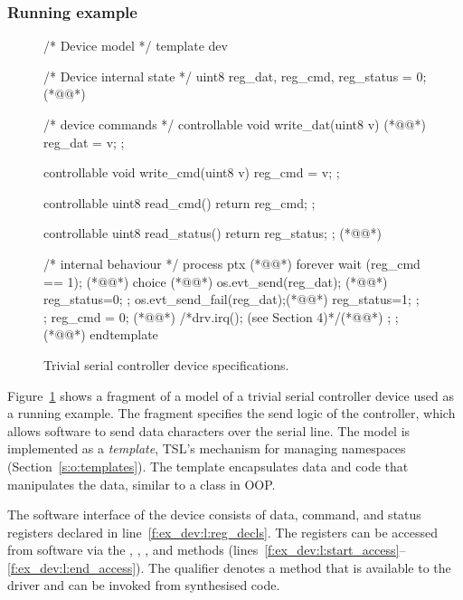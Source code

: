 \subsubsection{Running example}

\begin{figure}
\begin{tsllisting}[name=ex]
/* Device model */
template dev 

    /* Device internal state */
    uint8 reg_dat, reg_cmd, reg_status = 0; (*@\label{f:ex_dev:l:reg_decls}@*)

    /* device commands */
    controllable void write_dat(uint8 v) { (*@\label{f:ex_dev:l:start_access}@*)
        reg_dat = v; 
    };

    controllable void write_cmd(uint8 v) { 
        reg_cmd = v; 
    };

    controllable uint8 read_cmd() { 
        return reg_cmd; 
    };

    controllable uint8 read_status() { 
        return reg_status; 
    }; (*@\label{f:ex_dev:l:end_access}@*)

    /* internal behaviour */
    process ptx { (*@\label{f:ex_dev:l:start_xmit}@*)
        forever {
            wait (reg_cmd == 1); (*@\label{f:ex_dev:l:wait}@*)
            choice {(*@\label{f:ex_dev:l:atomic_start}@*)
                { 
                    os.evt_send(reg_dat); (*@\label{f:ex_dev:l:cb_succ}@*)
                    reg_status=0; 
                };
                { 
                    os.evt_send_fail(reg_dat);(*@\label{f:ex_dev:l:cb_fail}@*)
                    reg_status=1; 
                };
            };
            reg_cmd = 0; (*@\label{f:ex_dev:l:atomic_end}@*)
            /*drv.irq(); (see Section 4)*/(*@\label{f:ex_dev:l:irq}@*)
        };
    }; (*@\label{f:ex_dev:l:end_xmit}@*)
endtemplate
\end{tsllisting}
\caption{Trivial serial controller device specifications.}
\label{f:ex_dev}
\end{figure}

Figure~\ref{f:ex_dev} shows a fragment of a model of a trivial serial controller device used as a running example.  The fragment specifies the send logic of the controller, which allows software to send data characters over the serial line.  The model is implemented as a \tsl \emph{template}, TSL's mechanism for managing namespaces (Section~\ref{s:o:templates}).  The template encapsulates data and code that manipulates the data, similar to a class in OOP.

The software interface of the device consists of data, command, and status registers declared in line~\ref{f:ex_dev:l:reg_decls}.  The registers can be accessed from software via the , , , and  methods (lines~\ref{f:ex_dev:l:start_access}--\ref{f:ex_dev:l:end_access}).  The  qualifier denotes a method that is available to the driver and can be invoked from synthesised code.

